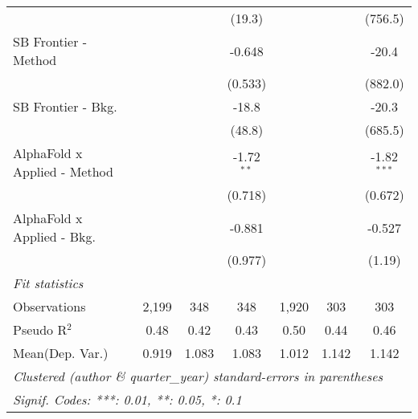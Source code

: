 \begin{tabular}{lcccccc}
                                &               &              & (19.3)        &               &              & (756.5)\\   
   SB Frontier - Method         &               &              & -0.648        &               &              & -20.4\\   
                                &               &              & (0.533)       &               &              & (882.0)\\   
   SB Frontier - Bkg.           &               &              & -18.8         &               &              & -20.3\\   
                                &               &              & (48.8)        &               &              & (685.5)\\   
   AlphaFold x Applied - Method &               &              & -1.72$^{**}$  &               &              & -1.82$^{***}$\\   
                                &               &              & (0.718)       &               &              & (0.672)\\   
   AlphaFold x Applied - Bkg.   &               &              & -0.881        &               &              & -0.527\\   
                                &               &              & (0.977)       &               &              & (1.19)\\   
   \midrule
   \emph{Fit statistics}\\
   Observations                 & 2,199         & 348          & 348           & 1,920         & 303          & 303\\  
   Pseudo R$^2$                 & 0.48          & 0.42         & 0.43          & 0.50          & 0.44         & 0.46\\  
Mean(Dep. Var.) & 0.919 & 1.083 & 1.083 & 1.012 & 1.142 & 1.142 \\
   \midrule \midrule
   \multicolumn{7}{l}{\emph{Clustered (author \& quarter\_year) standard-errors in parentheses}}\\
   \multicolumn{7}{l}{\emph{Signif. Codes: ***: 0.01, **: 0.05, *: 0.1}}\\
\end{tabular}
\par\endgroup
